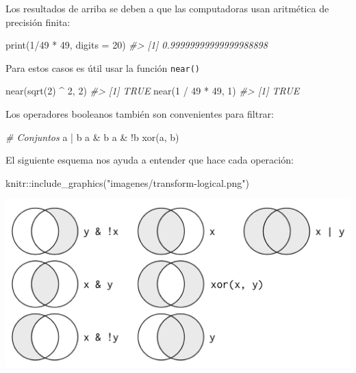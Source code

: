 \documentclass[
]{book}
\newenvironment{Shaded}{\begin{snugshade}}{\end{snugshade}}
\newcommand{\AttributeTok}[1]{\textcolor[rgb]{0.77,0.63,0.00}{#1}}
\newcommand{\CommentTok}[1]{\textcolor[rgb]{0.56,0.35,0.01}{\textit{#1}}}
\newcommand{\DecValTok}[1]{\textcolor[rgb]{0.00,0.00,0.81}{#1}}
\newcommand{\FunctionTok}[1]{\textcolor[rgb]{0.00,0.00,0.00}{#1}}
\newcommand{\NormalTok}[1]{#1}
\newcommand{\SpecialCharTok}[1]{\textcolor[rgb]{0.00,0.00,0.00}{#1}}
\newcommand{\StringTok}[1]{\textcolor[rgb]{0.31,0.60,0.02}{#1}}
\begin{document}
Los resultados de arriba se deben a que las computadoras
usan aritmética de precisión finita:

\begin{Shaded}
\begin{Highlighting}[]
\FunctionTok{print}\NormalTok{(}\DecValTok{1}\SpecialCharTok{/}\DecValTok{49} \SpecialCharTok{*} \DecValTok{49}\NormalTok{, }\AttributeTok{digits =} \DecValTok{20}\NormalTok{)}
\CommentTok{\#\textgreater{} [1] 0.99999999999999988898}
\end{Highlighting}
\end{Shaded}

Para estos casos es útil usar la función \texttt{near()}

\begin{Shaded}
\begin{Highlighting}[]
\FunctionTok{near}\NormalTok{(}\FunctionTok{sqrt}\NormalTok{(}\DecValTok{2}\NormalTok{) }\SpecialCharTok{\^{}} \DecValTok{2}\NormalTok{,  }\DecValTok{2}\NormalTok{)}
\CommentTok{\#\textgreater{} [1] TRUE}
\FunctionTok{near}\NormalTok{(}\DecValTok{1} \SpecialCharTok{/} \DecValTok{49} \SpecialCharTok{*} \DecValTok{49}\NormalTok{, }\DecValTok{1}\NormalTok{)}
\CommentTok{\#\textgreater{} [1] TRUE}
\end{Highlighting}
\end{Shaded}

Los operadores booleanos también son convenientes para
filtrar:

\begin{Shaded}
\begin{Highlighting}[]
\CommentTok{\# Conjuntos}
\NormalTok{a }\SpecialCharTok{|}\NormalTok{ b}
\NormalTok{a }\SpecialCharTok{\&}\NormalTok{ b}
\NormalTok{a }\SpecialCharTok{\&} \SpecialCharTok{!}\NormalTok{b}
\FunctionTok{xor}\NormalTok{(a, b)}
\end{Highlighting}
\end{Shaded}

El siguiente esquema nos ayuda a entender que hace cada operación:

\begin{Shaded}
\begin{Highlighting}[]
\NormalTok{knitr}\SpecialCharTok{::}\FunctionTok{include\_graphics}\NormalTok{(}\StringTok{"imagenes/transform{-}logical.png"}\NormalTok{)}
\end{Highlighting}
\end{Shaded}

\begin{center}\includegraphics[width=16.08in]{imagenes/transform-logical} \end{center}
\end{document}
